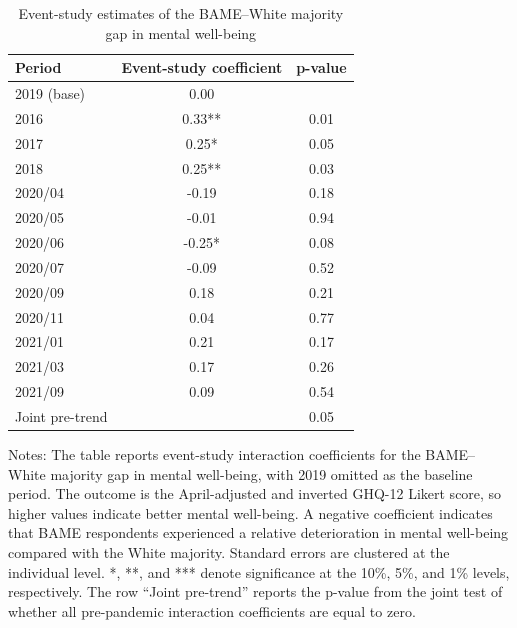 \begin{table}[htbp]
\centering
\caption{Event-study estimates of the BAME--White majority gap in mental well-being}
\label{tab:event_study_bame}
\small
\begin{tabular}{lcc}
\toprule
Period & Event-study coefficient & p-value \\
\midrule
2019 (base) & 0.00 &  \\
2016 & 0.33** & 0.01 \\
2017 & 0.25* & 0.05 \\
2018 & 0.25** & 0.03 \\
2020/04 & -0.19 & 0.18 \\
2020/05 & -0.01 & 0.94 \\
2020/06 & -0.25* & 0.08 \\
2020/07 & -0.09 & 0.52 \\
2020/09 & 0.18 & 0.21 \\
2020/11 & 0.04 & 0.77 \\
2021/01 & 0.21 & 0.17 \\
2021/03 & 0.17 & 0.26 \\
2021/09 & 0.09 & 0.54 \\
Joint pre-trend &  & 0.05 \\
\bottomrule
\end{tabular}

\begin{flushleft}
\footnotesize
Notes: The table reports event-study interaction coefficients for the BAME--White majority gap in mental well-being, with 2019 omitted as the baseline period. The outcome is the April-adjusted and inverted GHQ-12 Likert score, so higher values indicate better mental well-being. A negative coefficient indicates that BAME respondents experienced a relative deterioration in mental well-being compared with the White majority. Standard errors are clustered at the individual level. *, **, and *** denote significance at the 10\%, 5\%, and 1\% levels, respectively. The row ``Joint pre-trend'' reports the p-value from the joint test of whether all pre-pandemic interaction coefficients are equal to zero.
\end{flushleft}
\end{table}